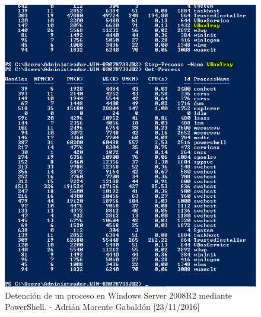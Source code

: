 \begin{figure}[H]
	\centering
	\includegraphics[scale=0.6]{powershell-stop}
	\caption{Detención de un proceso en Windows Server 2008R2 mediante PowerShell. - Adrián Morente Gabaldón [23/11/2016]}
	\label{fig:figura15}
\end{figure}






